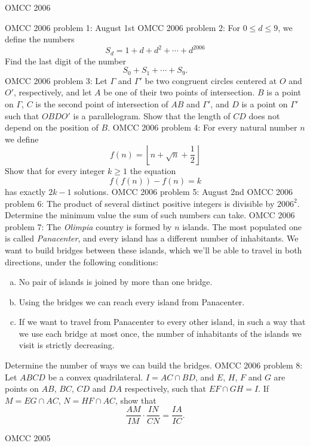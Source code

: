OMCC 2006 

OMCC 2006 problem 1:  August 1st 
OMCC 2006 problem 2:  For $0 \leq d \leq 9$, we define the numbers
\[ S_d=1+d+d^2+\cdots+d^{2006} \]
Find the last digit of the number
\[ S_0+S_1+\cdots+S_9. \] 
OMCC 2006 problem 3:  Let $\Gamma$ and $\Gamma'$ be two congruent circles centered at $O$ and $O'$, respectively, and let $A$ be one of their two points of intersection. $B$ is a point on $\Gamma$, $C$ is the second point of intersection of $AB$ and $\Gamma'$, and $D$ is a point on $\Gamma'$ such that $OBDO'$ is a parallelogram. Show that the length of $CD$ does not depend on the position of $B$. 
OMCC 2006 problem 4:  For every natural number $n$ we define
\[ f(n)=\left\lfloor n+\sqrt{n}+\frac{1}{2}\right\rfloor \]
Show that for every integer $k \geq 1$ the equation
\[ f(f(n))-f(n)=k \]
has exactly $2k-1$ solutions. 
OMCC 2006 problem 5:  August 2nd 
OMCC 2006 problem 6:  The product of several distinct positive integers is divisible by ${2006}^2$. Determine the minimum value the sum of such numbers can take. 
OMCC 2006 problem 7:  The \textit{Olimpia} country is formed by $n$ islands. The most populated one is called \textit{Panacenter}, and every island has a different number of inhabitants. We want to build bridges between these islands, which we'll be able to travel in both directions, under the following conditions:
\begin{enumerate}[a)]
  \item No pair of islands is joined by more than one bridge.
  \item Using the bridges we can reach every island from Panacenter.
  \item If we want to travel from Panacenter to every other island, in such a way that we use each bridge at most once, the number of inhabitants of the islands we visit is strictly decreasing.
\end{enumerate}
Determine the number of ways we can build the bridges. 
OMCC 2006 problem 8:  Let $ABCD$ be a convex quadrilateral. $I=AC\cap BD$, and $E$, $H$, $F$ and $G$ are points on $AB$, $BC$, $CD$ and $DA$ respectively, such that $EF \cap GH= I$. If $M=EG \cap AC$, $N=HF \cap AC$, show that
\[ \frac{AM}{IM}\cdot \frac{IN}{CN}=\frac{IA}{IC}. \] 

OMCC 2005 

